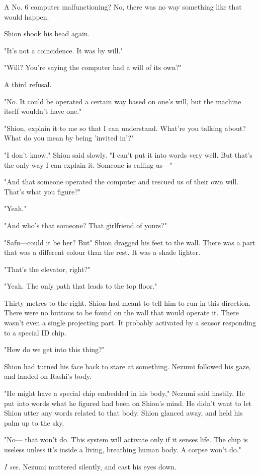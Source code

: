 A No. 6 computer malfunctioning? No, there was no way something like
that would happen.~

Shion shook his head again.

"It's not a coincidence. It was by will."

"Will? You're saying the computer had a will of its own?"

A third refusal.

"No. It could be operated a certain way based on one's will, but the
machine itself wouldn't have one."

"Shion, explain it to me so that I can understand. What're you talking
about? What do you mean by being 'invited in'?"

"I don't know," Shion said slowly. "I can't put it into words very well.
But that's the only way I can explain it. Someone is calling us---"

"And that someone operated the computer and rescued us of their own
will. That's what you figure?"

"Yeah."

"And who's that someone? That girlfriend of yours?"

"Safu---could it be her? But\el " Shion dragged his feet to the wall. There
was a part that was a different colour than the rest. It was a shade
lighter.

"That's the elevator, right?"

"Yeah. The only path that leads to the top floor."

Thirty metres to the right. Shion had meant to tell him to run in this
direction. There were no buttons to be found on the wall that would
operate it. There wasn't even a single projecting part. It probably
activated by a sensor responding to a special ID chip.

"How do we get into this thing?"

Shion had turned his face back to stare at something. Nezumi followed
his gaze, and landed on Rashi's body.

"He might have a special chip embedded in his body," Nezumi said
hastily. He put into words what he figured had been on Shion's mind. He
didn't want to let Shion utter any words related to that body. Shion
glanced away, and held his palm up to the sky.

"No--- that won't do. This system will activate only if it senses life.
The chip is useless unless it's inside a living, breathing human body. A
corpse won't do."

\emph{I see.} Nezumi muttered silently, and cast his eyes down.

